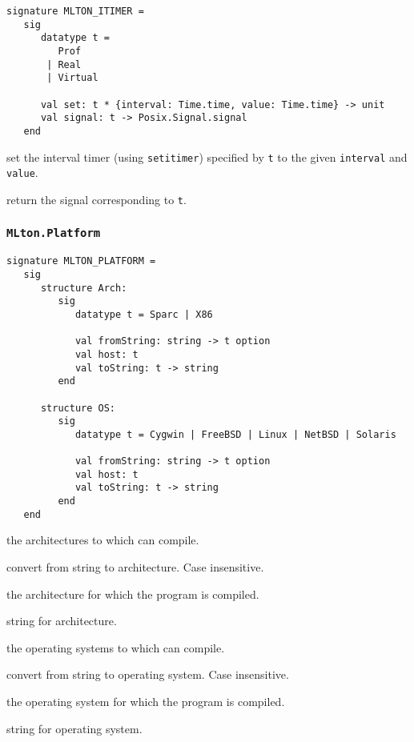 
\begin{verbatim}
signature MLTON_ITIMER =
   sig
      datatype t =
         Prof
       | Real
       | Virtual

      val set: t * {interval: Time.time, value: Time.time} -> unit
      val signal: t -> Posix.Signal.signal
   end
\end{verbatim}

\begin{description}
set the interval timer (using {\tt setitimer}) specified by {\tt t} to
the given {\tt interval} and {\tt value}.

return the signal corresponding to {\tt t}.
\end{description}
%
\subsubsection{\tt MLton.Platform}

\begin{verbatim}
signature MLTON_PLATFORM =
   sig
      structure Arch:
         sig
            datatype t = Sparc | X86

            val fromString: string -> t option
            val host: t
            val toString: t -> string
         end
         
      structure OS:
         sig
            datatype t = Cygwin | FreeBSD | Linux | NetBSD | Solaris

            val fromString: string -> t option
            val host: t
            val toString: t -> string
         end
   end
\end{verbatim}

\begin{description}

the architectures to which {\mlton} can compile.

convert from string to architecture.  Case insensitive.

the architecture for which the program is compiled.

string for architecture.

the operating systems to which {\mlton} can compile.

convert from string to operating system.  Case insensitive.

the operating system for which the program is compiled.

string for operating system.

\end{description}
%

